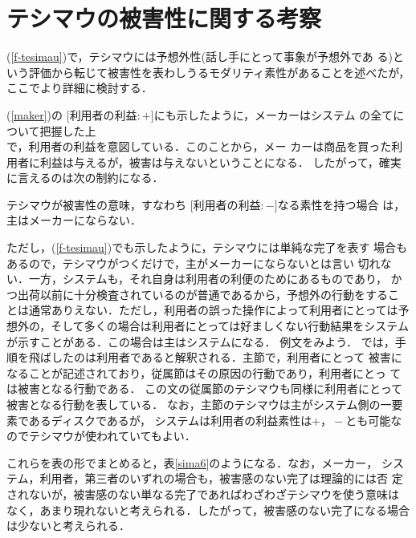 {\section{テシマウの被害性に関する考察}

(\ref{f-tesimau})で，テシマウには予想外性(話し手にとって事象が予想外であ
る)という評価から転じて被害性を表わしうるモダリティ素性があることを述べたが，
ここでより詳細に検討する．

(\ref{maker})の $[$利用者の利益$:+]$にも示したように，メーカーはシステム
の全てについて把握した上\\で，利用者の利益を意図している．このことから，メー
カーは商品を買った利用者に利益は与えるが，被害は与えないということになる．
したがって，確実に言えるのは次の制約になる．

\begin{co}\label{teiru5}
テシマウが被害性の意味，すなわち $[$利用者の利益$:-]$なる素性を持つ場合
は，{\dg 主}はメーカーにならない．
\end{co}

ただし，(\ref{f-tesimau})でも示したように，テシマウには単純な完了を表す
場合もあるので，テシマウがつくだけで，{\dg 主}がメーカーにならないとは言い
切れない．一方，システムも，それ自身は利用者の利便のためにあるものであり，
かつ出荷以前に十分検査されているのが普通であるから，予想外の行動をするこ
とは通常ありえない．ただし，利用者の誤った操作によって利用者にとっては予
想外の，そして多くの場合は利用者にとっては好ましくない行動結果をシステム
が示すことがある．この場合は{\dg 主}はシステムになる．
例文をみよう．
では，手順を飛ばしたのは利用者であると解釈される．主節で，利用者にとって
被害になることが記述されており，従属節はその原因の行動であり，利用者にとっ
ては被害となる行動である．
この文の従属節のテシマウも同様に利用者にとって被害となる行動を表している．
なお，主節のテシマウは{\dg 主}がシステム側の一要素であるディスクであるが，
システムは利用者の利益素性は$+，-$とも可能なのでテシマウが使われていてもよい．

これらを表の形でまとめると，表\ref{sima6}のようになる．なお，メーカー，
システム，利用者，第三者のいずれの場合も，被害感のない完了は理論的には否
定されないが，被害感のない単なる完了であればわざわざテシマウを使う意味は
なく，あまり現れないと考えられる．したがって，被害感のない完了になる場合
は少ないと考えられる．

}
